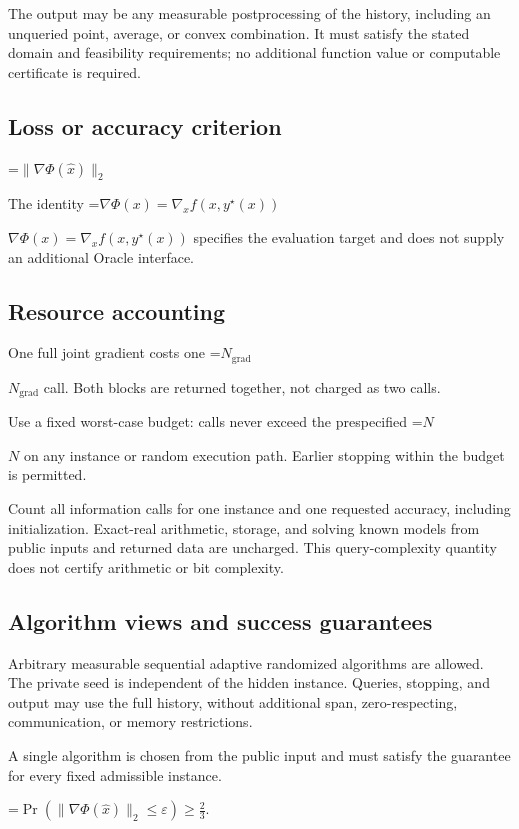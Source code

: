 \documentclass[10pt,a4paper]{article}
\newcommand{\AtlasMath}[1]{\par\begingroup\centering\setbox0=\hbox{$\displaystyle #1$}\ifdim\wd0>1.4\linewidth\typeout{ATLAS WIDE FORMULA: \the\wd0}\fi\ifdim\wd0>\linewidth\resizebox{\linewidth}{!}{\box0}\else\box0\fi\par\endgroup}
\newcommand{\AtlasInlineMath}[1]{\begingroup\setbox0=\hbox{$#1$}\ifdim\wd0>.4\linewidth\endgroup\AtlasMath{#1}\else\endgroup$#1$\fi}
\begin{document}
The output may be any measurable postprocessing of the history, including an unqueried point, average, or convex combination. It must satisfy the stated domain and feasibility requirements; no additional function value or computable certificate is required.

\subsection{Loss or accuracy criterion}

\AtlasMath{\|\nabla\Phi(\widehat{x})\|_2}


The identity \AtlasInlineMath{\nabla\Phi(x)=\nabla_xf(x,y^\star(x))} specifies the evaluation target and does not supply an additional Oracle interface.

\subsection{Resource accounting}
One full joint gradient costs one \AtlasInlineMath{N_{\mathrm{grad}}} call. Both blocks are returned together, not charged as two calls.

Use a fixed worst-case budget: calls never exceed the prespecified \AtlasInlineMath{N} on any instance or random execution path. Earlier stopping within the budget is permitted.

Count all information calls for one instance and one requested accuracy, including initialization. Exact-real arithmetic, storage, and solving known models from public inputs and returned data are uncharged. This query-complexity quantity does not certify arithmetic or bit complexity.

\subsection{Algorithm views and success guarantees}
Arbitrary measurable sequential adaptive randomized algorithms are allowed. The private seed is independent of the hidden instance. Queries, stopping, and output may use the full history, without additional span, zero-respecting, communication, or memory restrictions.

A single algorithm is chosen from the public input and must satisfy the guarantee for every fixed admissible instance.


\AtlasMath{\Pr\!\left(\|\nabla\Phi(\widehat{x})\|_2\le\varepsilon\right)\ge\frac23.}
\end{document}
